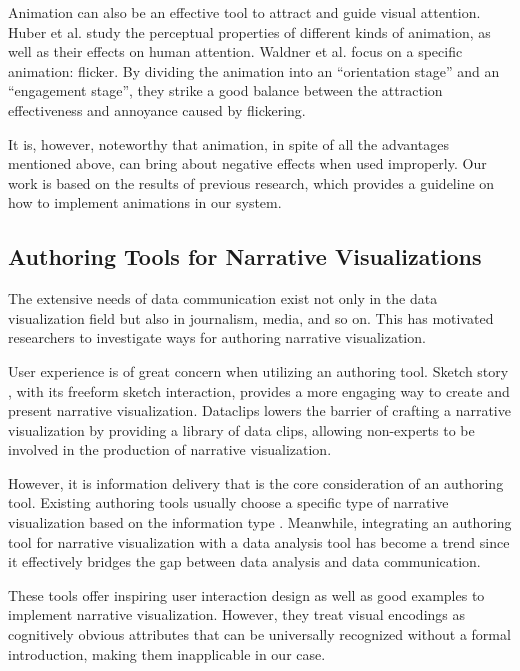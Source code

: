 Animation can also be an effective tool to attract and guide visual attention. Huber et al. \cite{huber_visualizing_2005} study the perceptual properties of different kinds of animation, as well as their effects on human attention. Waldner et al. \cite{waldner_attractive_2014} focus on a specific animation: flicker. By dividing the animation into an “orientation stage” and an “engagement stage”, they strike a good balance between the attraction effectiveness and annoyance caused by flickering. 

It is, however, noteworthy that animation, in spite of all the advantages mentioned above, can bring about negative effects when used improperly\cite{robertson_effectiveness_2008}. Our work is based on the results of previous research, which provides a guideline on how to implement animations in our system.

\subsection{Authoring Tools for Narrative Visualizations}
The extensive needs of data communication exist not only in the data visualization field but also in journalism, media, and so on. This has motivated researchers to investigate ways for authoring narrative visualization. 

User experience is of great concern when utilizing an authoring tool. Sketch story \cite{lee_sketchstory:_2013}, with its freeform sketch interaction, provides a more engaging way to create and present narrative visualization. Dataclips \cite{amini_authoring_2017} lowers the barrier of crafting a narrative visualization by providing a library of data clips, allowing non-experts to be involved in the production of narrative visualization. 

However, it is information delivery that is the core consideration of an authoring tool. Existing authoring tools usually choose a specific type of narrative visualization based on the information type \cite{amini_authoring_2017, fulda_timelinecurator:_2016}. Meanwhile, integrating an authoring tool for narrative visualization with a  data analysis tool has become a trend since it effectively bridges the gap between data analysis and data communication\cite{eccles_stories_2007, bryan_temporal_2016,lee_more_2015}. 
 
These tools offer inspiring user interaction design as well as good examples to implement narrative visualization. However, they treat visual encodings as cognitively obvious attributes that can be universally recognized without a formal introduction, making them inapplicable in our case. 

